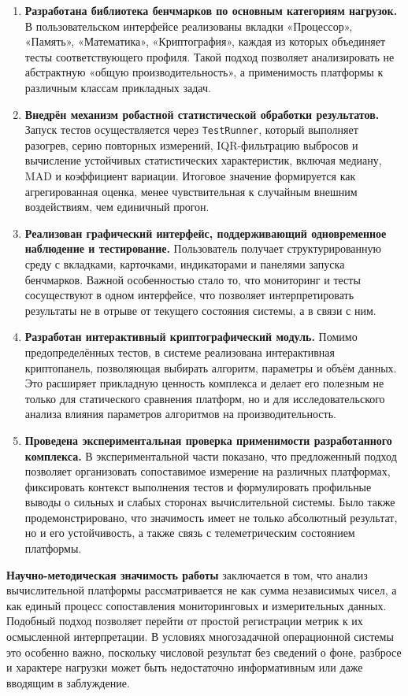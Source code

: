 \begin{enumerate}
    \item \textbf{Разработана библиотека бенчмарков по основным категориям нагрузок.} В пользовательском интерфейсе реализованы вкладки «Процессор», «Память», «Математика», «Криптография», каждая из которых объединяет тесты соответствующего профиля. Такой подход позволяет анализировать не абстрактную «общую производительность», а применимость платформы к различным классам прикладных задач.
    \item \textbf{Внедрён механизм робастной статистической обработки результатов.} Запуск тестов осуществляется через \texttt{TestRunner}, который выполняет разогрев, серию повторных измерений, IQR-фильтрацию выбросов и вычисление устойчивых статистических характеристик, включая медиану, MAD и коэффициент вариации. Итоговое значение формируется как агрегированная оценка, менее чувствительная к случайным внешним воздействиям, чем единичный прогон.
    \item \textbf{Реализован графический интерфейс, поддерживающий одновременное наблюдение и тестирование.} Пользователь получает структурированную среду с вкладками, карточками, индикаторами и панелями запуска бенчмарков. Важной особенностью стало то, что мониторинг и тесты сосуществуют в одном интерфейсе, что позволяет интерпретировать результаты не в отрыве от текущего состояния системы, а в связи с ним.
    \item \textbf{Разработан интерактивный криптографический модуль.} Помимо предопределённых тестов, в системе реализована интерактивная криптопанель, позволяющая выбирать алгоритм, параметры и объём данных. Это расширяет прикладную ценность комплекса и делает его полезным не только для статического сравнения платформ, но и для исследовательского анализа влияния параметров алгоритмов на производительность.
    \item \textbf{Проведена экспериментальная проверка применимости разработанного комплекса.} В экспериментальной части показано, что предложенный подход позволяет организовать сопоставимое измерение на различных платформах, фиксировать контекст выполнения тестов и формулировать профильные выводы о сильных и слабых сторонах вычислительной системы. Было также продемонстрировано, что значимость имеет не только абсолютный результат, но и его устойчивость, а также связь с телеметрическим состоянием платформы.
\end{enumerate}

\textbf{Научно-методическая значимость работы} заключается в том, что анализ вычислительной платформы рассматривается не как сумма независимых чисел, а как единый процесс сопоставления мониторинговых и измерительных данных. Подобный подход позволяет перейти от простой регистрации метрик к их осмысленной интерпретации. В условиях многозадачной операционной системы это особенно важно, поскольку числовой результат без сведений о фоне, разбросе и характере нагрузки может быть недостаточно информативным или даже вводящим в заблуждение.

